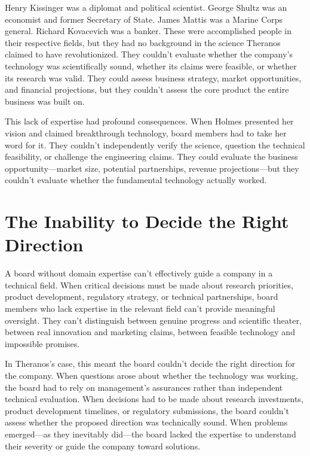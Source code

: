 Henry Kissinger was a diplomat and political scientist. George Shultz was an economist and former Secretary of State. James Mattis was a Marine Corps general. Richard Kovacevich was a banker. These were accomplished people in their respective fields, but they had no background in the science Theranos claimed to have revolutionized. They couldn't evaluate whether the company's technology was scientifically sound, whether its claims were feasible, or whether its research was valid. They could assess business strategy, market opportunities, and financial projections, but they couldn't assess the core product the entire business was built on.

This lack of expertise had profound consequences. When Holmes presented her vision and claimed breakthrough technology, board members had to take her word for it. They couldn't independently verify the science, question the technical feasibility, or challenge the engineering claims. They could evaluate the business opportunity—market size, potential partnerships, revenue projections—but they couldn't evaluate whether the fundamental technology actually worked.

\section{The Inability to Decide the Right Direction}

A board without domain expertise can't effectively guide a company in a technical field. When critical decisions must be made about research priorities, product development, regulatory strategy, or technical partnerships, board members who lack expertise in the relevant field can't provide meaningful oversight. They can't distinguish between genuine progress and scientific theater, between real innovation and marketing claims, between feasible technology and impossible promises.

In Theranos's case, this meant the board couldn't decide the right direction for the company. When questions arose about whether the technology was working, the board had to rely on management's assurances rather than independent technical evaluation. When decisions had to be made about research investments, product development timelines, or regulatory submissions, the board couldn't assess whether the proposed direction was technically sound. When problems emerged—as they inevitably did—the board lacked the expertise to understand their severity or guide the company toward solutions.

